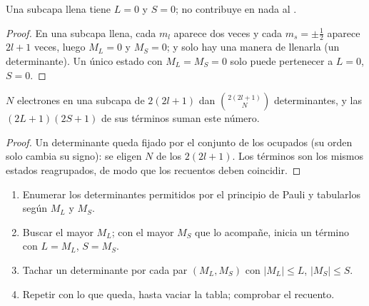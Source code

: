 \begin{proposition}\label{prop:b3:many-electron-atoms:closed-shell}
Una subcapa llena tiene $L = 0$ y $S = 0$; no contribuye en nada al
.
\end{proposition}

\begin{proof}
En una subcapa llena, cada $m_l$ aparece dos veces y cada $m_s = \pm\frac12$
aparece $2l+1$ veces, luego $M_L = 0$ y $M_S = 0$; y solo hay una manera de
llenarla (un determinante). Un único estado con $M_L = M_S = 0$ solo puede
pertenecer a $L = 0$, $S = 0$.
\end{proof}

\begin{proposition}\label{prop:b3:many-electron-atoms:count}
$N$ electrones en una subcapa de $2(2l+1)$  dan
$\binom{2(2l+1)}{N}$ determinantes, y las  $(2L+1)(2S+1)$ de
sus términos suman este número.
\end{proposition}

\begin{proof}
Un determinante queda fijado por el conjunto de los  ocupados (su orden
solo cambia su signo): se eligen $N$ de los $2(2l+1)$. Los términos son los
mismos estados reagrupados, de modo que los recuentos deben coincidir.
\end{proof}

\begin{method}\label{met:b3:many-electron-atoms:terms}
\begin{enumerate}
  \item Enumerar los determinantes permitidos por el principio de Pauli y tabularlos
        según $M_L$ y $M_S$.
  \item Buscar el mayor $M_L$; con el mayor $M_S$ que lo acompañe,
        inicia un término con $L = M_L$, $S = M_S$.
  \item Tachar un determinante por cada par $(M_L, M_S)$ con
        $|M_L| \le L$, $|M_S| \le S$.
  \item Repetir con lo que queda, hasta vaciar la tabla; comprobar el recuento.
\end{enumerate}
\end{method}

